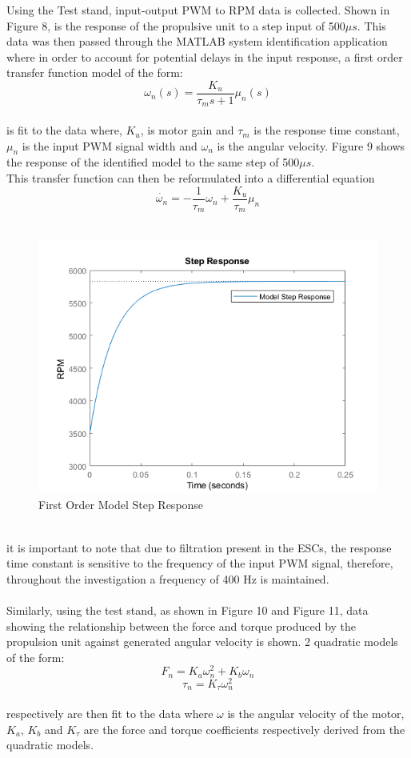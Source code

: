 \documentclass[12pt,a4paper,twoside]{report}
\begin{document}
				Using the Test stand, input-output PWM to RPM data is collected. Shown in Figure 8, is the response of the propulsive unit to a step input of 500$\mu s$. This data was then passed through the MATLAB system identification application where in order to account for potential delays in the input response, a first order transfer function model of the form:
				\\
				\[ \omega_n(s) = \frac{K_u}{\tau_m s + 1} \mu_n(s) \]
				\\
				is fit to the data where, $K_u$, is motor gain and $\tau_m$ is the response time constant, $\mu_n$ is the input PWM signal width and $\omega_n$ is the angular velocity. Figure 9 shows the response of the identified model to the same step of 500$\mu s$.
				\\
				This transfer function can then be reformulated into a differential equation
				\[\dot{\omega_n} = -\frac{1}{\tau_m}\omega_n	 + \frac{K_u}{\tau_m}\mu_n\]
				\\
				\begin{figure}[h!]
					\centering
					\includegraphics[width=0.8\linewidth]{ModelStep.png}
					\caption{First Order Model Step Response}
					\label{fig:modelstep}
				\end{figure}
				\\
				it is important to note that due to filtration present in the ESCs, the response time constant is sensitive to the frequency of the input PWM signal, therefore, throughout the investigation a frequency of 400 Hz is maintained.
				\\ \\
				Similarly, using the test stand, as shown in Figure 10 and Figure 11, data showing the relationship between the force and torque produced by the propulsion unit against generated angular velocity is shown. 2 quadratic models of the form: 
				\\
				\[ F_n = K_a \omega_n^2 + K_b\omega_n \]
				\[\tau_n = K_\tau \omega_n^2 \]
				\\
				respectively are then fit to the data where $\omega$ is the angular velocity of the motor, $K_a$, $K_b$ and $K_\tau$ are the force and torque coefficients respectively derived from the quadratic models.
				
\end{document}
